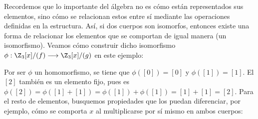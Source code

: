 \begin{ejs}
        Recordemos que lo importante del álgebra no es cómo están representados sus elementos, sino cómo se relacionan estos entre sí mediante las operaciones definidas en la estructura. Así, si dos cuerpos son isomorfos, entonces existe una forma de relacionar los elementos que se comportan de igual manera (un isomorfismo). Veamos cómo construir dicho isomorfismo $\phi: \Z_3[x]/(f) \longrightarrow \Z_3[x]/(g)$ en este ejemplo:
        
        Por ser $\phi$ un homomorfismo, se tiene que $\phi([0]) = [0]$ y $\phi([1]) = [1]$. El $[2]$ también es un elemento fijo, pues es $\phi([2]) = \phi([1] + [1]) =\phi([1]) +\phi([1]) = [1] + [1] = [2]$. Para el resto de elementos, busquemos propiedades que los puedan diferenciar, por ejemplo, cómo se comporta $x$ al multiplicarse por sí mismo en ambos cuerpos: 
    

\end{ejs}
